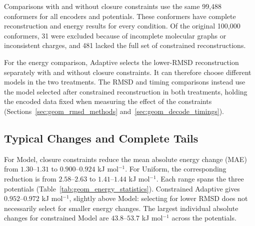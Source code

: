 \documentclass[%
 preprint,
superscriptaddress,
 amsmath,amssymb,
 aip,
 jcp,
]{revtex4-2}
\begin{document}
Comparisons with and without closure constraints use the same 99,488 conformers for all encoders and potentials.
These conformers have complete reconstruction and energy results for every condition.
Of the original 100,000 conformers, 31 were excluded because of incomplete molecular graphs or inconsistent charges, and 481 lacked the full set of constrained reconstructions.

For the energy comparison, Adaptive selects the lower-RMSD reconstruction separately with and without closure constraints.
It can therefore choose different models in the two treatments.
The RMSD and timing comparisons instead use the model selected after constrained reconstruction in both treatments, holding the encoded data fixed when measuring the effect of the constraints (Sections~\ref{sec:geom_rmsd_methods} and~\ref{sec:geom_decode_timings}).

\subsection{Typical Changes and Complete Tails}

For Model, closure constraints reduce the mean absolute energy change (MAE) from $1.30$--$1.31$ to $0.900$--$0.924$ kJ mol$^{-1}$.
For Uniform, the corresponding reduction is from $2.58$--$2.63$ to $1.41$--$1.44$ kJ mol$^{-1}$.
Each range spans the three potentials (Table~\ref{tab:geom_energy_statistics}).
Constrained Adaptive gives $0.952$--$0.972$ kJ mol$^{-1}$, slightly above Model: selecting for lower RMSD does not necessarily select for smaller energy changes.
The largest individual absolute changes for constrained Model are $43.8$--$53.7$ kJ mol$^{-1}$ across the potentials.
\end{document}
